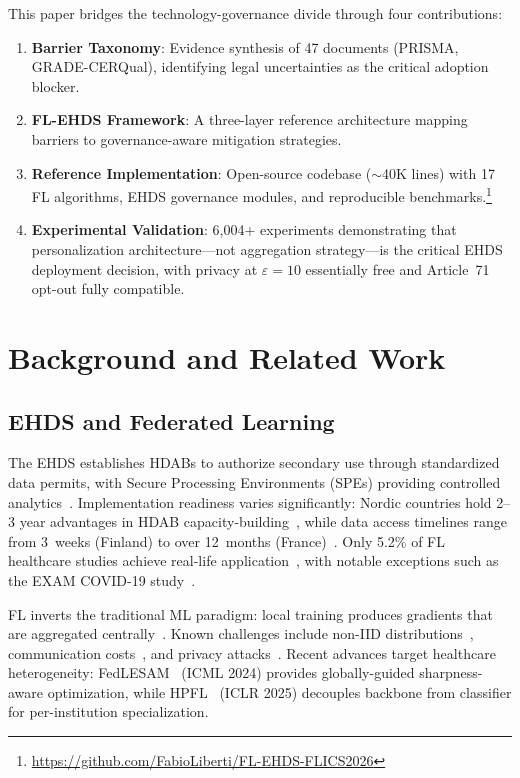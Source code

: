 \documentclass[conference]{IEEEtran}
\begin{document}
This paper bridges the technology-governance divide through four contributions:
\begin{enumerate}
    \item \textbf{Barrier Taxonomy}: Evidence synthesis of 47 documents (PRISMA, GRADE-CERQual), identifying legal uncertainties as the critical adoption blocker.
    \item \textbf{FL-EHDS Framework}: A three-layer reference architecture mapping barriers to governance-aware mitigation strategies.
    \item \textbf{Reference Implementation}: Open-source codebase ($\sim$40K lines) with 17 FL algorithms, EHDS governance modules, and reproducible benchmarks.\footnote{\url{https://github.com/FabioLiberti/FL-EHDS-FLICS2026}}
    \item \textbf{Experimental Validation}: 6,004+ experiments demonstrating that personalization architecture---not aggregation strategy---is the critical EHDS deployment decision, with privacy at $\varepsilon{=}10$ essentially free and Article~71 opt-out fully compatible.
\end{enumerate}

\section{Background and Related Work}
\label{sec:background}

\subsection{EHDS and Federated Learning}

The EHDS establishes HDABs to authorize secondary use through standardized data permits, with Secure Processing Environments (SPEs) providing controlled analytics~\cite{svingel2025hdab}. Implementation readiness varies significantly: Nordic countries hold 2--3 year advantages in HDAB capacity-building~\cite{tehdas2024ready}, while data access timelines range from 3~weeks (Finland) to over 12~months (France)~\cite{forster2025journeys}. Only 5.2\% of FL healthcare studies achieve real-life application~\cite{teo2024systematic}, with notable exceptions such as the EXAM COVID-19 study~\cite{dayan2021federated}.

FL inverts the traditional ML paradigm: local training produces gradients that are aggregated centrally~\cite{mcmahan2017communication}. Known challenges include non-IID distributions~\cite{li2020federated}, communication costs~\cite{bonawitz2019scale}, and privacy attacks~\cite{zhu2019deep, shokri2017membership}. Recent advances target healthcare heterogeneity: FedLESAM~\cite{qu2024fedlesam} (ICML 2024) provides globally-guided sharpness-aware optimization, while HPFL~\cite{chen2025hpfl} (ICLR 2025) decouples backbone from classifier for per-institution specialization.
\end{document}
